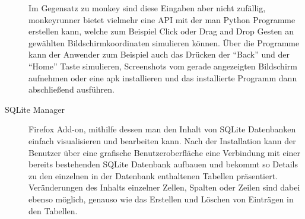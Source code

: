 \begin{description}
		Im Gegensatz zu monkey sind diese Eingaben aber nicht zufällig, monkeyrunner bietet vielmehr eine API mit der man Python Programme erstellen kann, welche zum Beispiel Click oder Drag and Drop Gesten an gewählten Bildschirmkoordinaten simulieren können.
		Über die Programme kann der Anwender zum Beispiel auch das Drücken der "`Back"' und der "`Home"' Taste simulieren, Screenshots vom gerade angezeigten Bildschirm aufnehmen oder eine apk installieren und das installierte Programm dann abschließend ausführen.
	\item[SQLite Manager] Firefox Add-on, mithilfe dessen man den Inhalt von SQLite Datenbanken einfach visualisieren und bearbeiten kann.
		Nach der Installation kann der Benutzer über eine grafische Benutzeroberfläche eine Verbindung mit einer bereits bestehenden SQLite Datenbank aufbauen und bekommt so Details zu den einzelnen in der Datenbank enthaltenen Tabellen präsentiert.
		Veränderungen des Inhalts einzelner Zellen, Spalten oder Zeilen sind dabei ebenso möglich, genauso wie das Erstellen und Löschen von Einträgen in den Tabellen.
\end{description}
